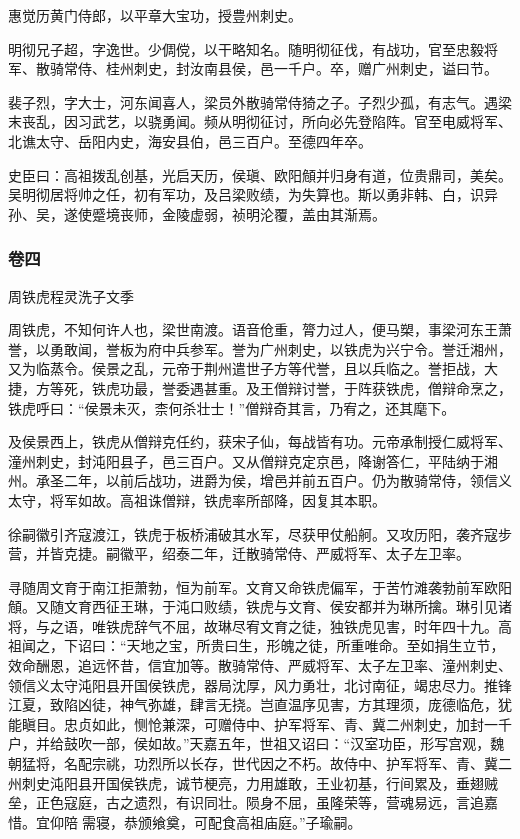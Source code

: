 \documentclass[]{article}
\begin{document}
惠觉历黄门侍郎，以平章大宝功，授豊州刺史。

明彻兄子超，字逸世。少倜傥，以干略知名。随明彻征伐，有战功，官至忠毅将军、散骑常侍、桂州刺史，封汝南县侯，邑一千户。卒，赠广州刺史，谥曰节。

裴子烈，字大士，河东闻喜人，梁员外散骑常侍猗之子。子烈少孤，有志气。遇梁末丧乱，因习武艺，以骁勇闻。频从明彻征讨，所向必先登陷阵。官至电威将军、北谯太守、岳阳内史，海安县伯，邑三百户。至德四年卒。

史臣曰：高祖拨乱创基，光启天历，侯瑱、欧阳頠并归身有道，位贵鼎司，美矣。吴明彻居将帅之任，初有军功，及吕梁败绩，为失算也。斯以勇非韩、白，识异孙、吴，遂使蹙境丧师，金陵虚弱，祯明沦覆，盖由其渐焉。

\hypertarget{header-n4370}{%
\subsubsection{卷四}\label{header-n4370}}

周铁虎程灵洗子文季

周铁虎，不知何许人也，梁世南渡。语音伧重，膂力过人，便马槊，事梁河东王萧誉，以勇敢闻，誉板为府中兵参军。誉为广州刺史，以铁虎为兴宁令。誉迁湘州，又为临蒸令。侯景之乱，元帝于荆州遣世子方等代誉，且以兵临之。誉拒战，大捷，方等死，铁虎功最，誉委遇甚重。及王僧辩讨誉，于阵获铁虎，僧辩命烹之，铁虎呼曰：``侯景未灭，柰何杀壮士！''僧辩奇其言，乃宥之，还其麾下。

及侯景西上，铁虎从僧辩克任约，获宋子仙，每战皆有功。元帝承制授仁威将军、潼州刺史，封沌阳县子，邑三百户。又从僧辩克定京邑，降谢答仁，平陆纳于湘州。承圣二年，以前后战功，进爵为侯，增邑并前五百户。仍为散骑常侍，领信义太守，将军如故。高祖诛僧辩，铁虎率所部降，因复其本职。

徐嗣徽引齐寇渡江，铁虎于板桥浦破其水军，尽获甲仗船舸。又攻历阳，袭齐寇步营，并皆克捷。嗣徽平，绍泰二年，迁散骑常侍、严威将军、太子左卫率。

寻随周文育于南江拒萧勃，恒为前军。文育又命铁虎偏军，于苦竹滩袭勃前军欧阳頠。又随文育西征王琳，于沌口败绩，铁虎与文育、侯安都并为琳所擒。琳引见诸将，与之语，唯铁虎辞气不屈，故琳尽宥文育之徒，独铁虎见害，时年四十九。高祖闻之，下诏曰：``天地之宝，所贵曰生，形魄之徒，所重唯命。至如捐生立节，效命酬恩，追远怀昔，信宜加等。散骑常侍、严威将军、太子左卫率、潼州刺史、领信义太守沌阳县开国侯铁虎，器局沈厚，风力勇壮，北讨南征，竭忠尽力。推锋江夏，致陷凶徒，神气弥雄，肆言无挠。岂直温序见害，方其理须，庞德临危，犹能瞋目。忠贞如此，恻怆兼深，可赠侍中、护军将军、青、冀二州刺史，加封一千户，并给鼓吹一部，侯如故。''天嘉五年，世祖又诏曰：``汉室功臣，形写宫观，魏朝猛将，名配宗祧，功烈所以长存，世代因之不朽。故侍中、护军将军、青、冀二州刺史沌阳县开国侯铁虎，诚节梗亮，力用雄敢，王业初基，行间累及，垂翅贼垒，正色寇庭，古之遗烈，有识同壮。陨身不屈，虽隆荣等，营魂易远，言追嘉惜。宜仰陪需寝，恭颁飨奠，可配食高祖庙庭。''子瑜嗣。
\end{document}
